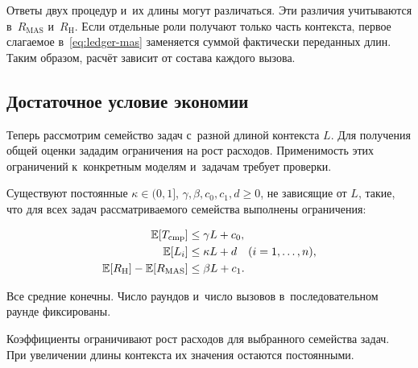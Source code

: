 Ответы двух процедур и~их длины могут различаться. Эти различия учитываются в~$R_{\mathrm{MAS}}$ и~$R_{\mathrm{H}}$. Если отдельные роли получают только часть контекста, первое слагаемое в~\eqref{eq:ledger-mas} заменяется суммой фактически переданных длин. Таким образом, расчёт зависит от состава каждого вызова.

\subsection{Достаточное условие экономии}
Теперь рассмотрим семейство задач с~разной длиной контекста $L$. Для получения общей оценки зададим ограничения на рост расходов. Применимость этих ограничений к~конкретным моделям и~задачам требует проверки.

\begin{assumption}\label{as:bounds}
Существуют постоянные $\kappa\in(0,1]$, $\gamma,\beta,c_0,c_1,d\ge0$, не зависящие от $L$, такие, что для всех задач рассматриваемого семейства выполнены ограничения:
\begin{formulakey}
\begin{align}
\mathbb{E}[T_{\mathrm{cmp}}]&\le\gamma L+c_0,\\
\mathbb{E}[L_i]&\le\kappa L+d\quad(i=1,\ldots,n),\\
\mathbb{E}[R_{\mathrm{H}}]-\mathbb{E}[R_{\mathrm{MAS}}]&\le\beta L+c_1.
\end{align}
\begin{symbols}
\end{symbols}
\end{formulakey}
Все средние конечны. Число раундов и~число вызовов в~последовательном раунде фиксированы.
\end{assumption}

Коэффициенты ограничивают рост расходов для выбранного семейства задач. При увеличении длины контекста их значения остаются постоянными.

